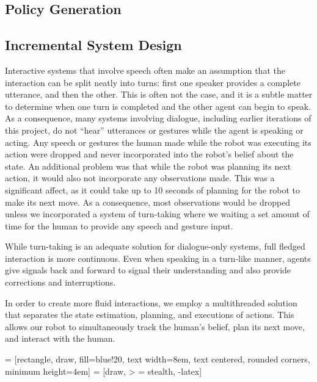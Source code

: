 \documentclass{article}
\begin{document}
\subsection{Policy Generation}


\subsection{Incremental System Design}

Interactive systems that involve speech often make an assumption that the interaction can be split neatly into turns: first one speaker provides a complete utterance, and then the other. This is often not the case, and it is a subtle matter to determine when one turn is completed and the other agent can begin to speak. As a consequence, many systems involving dialogue, including earlier iterations of this project, do not ``hear'' utterances or gestures while the agent is speaking or acting. Any speech or gestures the human made while the robot was executing its action were dropped and never incorporated into the robot's belief about the state. An additional problem was that while the robot was planning its next action, it would also not incorporate any observations made. This was a significant affect, as it could take up to 10 seconds of planning for the robot to make its next move. As a consequence, most observations would be dropped unless we incorporated a system of turn-taking where we waiting a set amount of time for the human to provide any speech and gesture input. 

While turn-taking is an adequate solution for dialogue-only systems, full fledged interaction is more continuous. Even when speaking in a turn-like manner, agents give signals back and forward to signal their understanding and also provide corrections and interruptions.

In order to create more fluid interactions, we employ a multithreaded solution that separates the state estimation, planning, and executions of actions. This allows our robot to simultaneously track the human's belief, plan its next move, and interact with the human. 


 = [rectangle, draw, fill=blue!20, text width=8em, text centered, rounded corners, minimum height=4em]
 = [draw, > = stealth, -latex]
\end{document}
